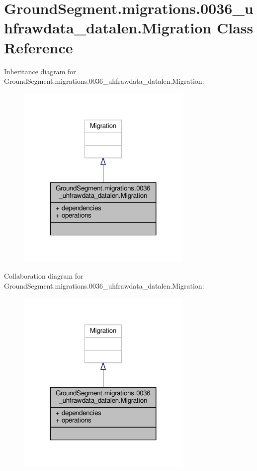 \hypertarget{class_ground_segment_1_1migrations_1_10036__uhfrawdata__datalen_1_1_migration}{}\section{Ground\+Segment.\+migrations.0036\+\_\+uhfrawdata\+\_\+datalen.Migration Class Reference}
\label{class_ground_segment_1_1migrations_1_10036__uhfrawdata__datalen_1_1_migration}


Inheritance diagram for Ground\+Segment.\+migrations.0036\+\_\+uhfrawdata\+\_\+datalen.Migration\+:\nopagebreak
\begin{figure}[H]
\begin{center}
\leavevmode
\includegraphics[width=239pt]{class_ground_segment_1_1migrations_1_10036__uhfrawdata__datalen_1_1_migration__inherit__graph}
\end{center}
\end{figure}


Collaboration diagram for Ground\+Segment.\+migrations.0036\+\_\+uhfrawdata\+\_\+datalen.Migration\+:\nopagebreak
\begin{figure}[H]
\begin{center}
\leavevmode
\includegraphics[width=239pt]{class_ground_segment_1_1migrations_1_10036__uhfrawdata__datalen_1_1_migration__coll__graph}
\end{center}
\end{figure}
